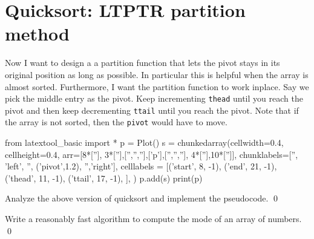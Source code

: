 \section{Quicksort: LTPTR partition method}

Now I want to design a a partition function that lets the pivot
stays in its original position as long as possible.
In particular this is helpful when the array is almost sorted.
Furthermore, I want the partition function to work inplace.
Say we pick the middle entry as the pivot.
Keep incrementing \verb!thead! until you reach the pivot and then
keep decrementing \verb!ttail! until you reach the pivot.
Note that if the array is not sorted, then the \verb!pivot! would have to move.

\begin{python}
from latextool_basic import *
p = Plot()
s = chunkedarray(cellwidth=0.4, 
                 cellheight=0.4,
                 arr=[8*[''], 3*[''],['','',''],['p'],['','',''], 4*[''],10*['']],
                 chunklabels=['', 'left', '', ('pivot',1.2), '','right'],
                 celllabels = [('start', 8, -1),
                               ('end',   21, -1),
                               ('thead', 11, -1),
                               ('ttail', 17, -1),
                              ],
)
p.add(s)
print(p)
\end{python}

\begin{ex}
Analyze the above version of quicksort and implement the pseudocode.
\qed
\end{ex}

\begin{ex}
Write a reasonably fast algorithm to compute the mode of an array of 
numbers.
\qed
\end{ex}
